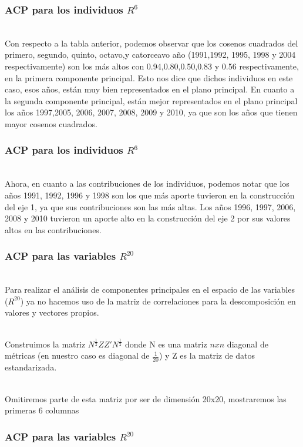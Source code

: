 \documentclass[12pt]{beamer}
\newcommand\Wider[2][3em]{%
\makebox[\linewidth][c]{%
  \begin{minipage}{\dimexpr\textwidth+#1\relax}
  \raggedright#2
  \end{minipage}%
  }%
}
\begin{document}
\begin{frame}
\frametitle{ACP para los individuos $R^6$}
~\\Con respecto a la tabla anterior, podemos observar que los cosenos cuadrados del primero, segundo, quinto, octavo,y catorceavo año (1991,1992, 1995, 1998 y 2004 respectivamente) son los más altos con 0.94,0.80,0.50,0.83 y 0.56 respectivamente, en la primera componente principal. Esto nos dice que dichos individuos en este caso, esos años, están muy bien representados en el plano principal. En cuanto a la segunda componente principal, están mejor representados en el plano principal los años 1997,2005, 2006, 2007, 2008, 2009 y 2010, ya que son los años que tienen mayor cosenos cuadrados.
\end{frame}

\begin{frame}
\frametitle{ACP para los individuos $R^6$}
~\\Ahora, en cuanto a las contribuciones de los individuos, podemos notar que los años 1991, 1992, 1996 y 1998 son los que más aporte tuvieron en la construcción del eje 1, ya que sus contribuciones son las más altas. Los años 1996, 1997, 2006, 2008 y 2010 tuvieron un aporte alto en la construcción del eje 2 por sus valores altos en las contribuciones.
\end{frame}

\begin{frame}
\frametitle{ACP para las variables $R^{20}$}
~\\Para realizar el análisis de componentes principales en el espacio de las variables ($R^{20}$) ya no hacemos uso de la matriz de correlaciones para la descomposición en valores y vectores propios. 

~\\Construimos la matriz $N^{\frac{1}{2}}ZZ'N^{\frac{1}{2}}$ donde N es una matriz $nxn$ diagonal de métricas (en nuestro caso es diagonal de $\frac{1}{20}$) y Z es la matriz de datos estandarizada.

~\\Omitiremos parte de esta matriz por ser de dimensión 20x20, mostraremos las primeras 6 columnas
\end{frame}

\begin{frame}
\frametitle{ACP para las variables $R^{20}$}
\Wider[4em]{
\begin{figure}[!h]
    \begin{center}
        \texttt{[image: imagenes/N.png]}
        \label{figura1}
    \end{center}
\end{figure}
}
\end{frame}
\end{document}
